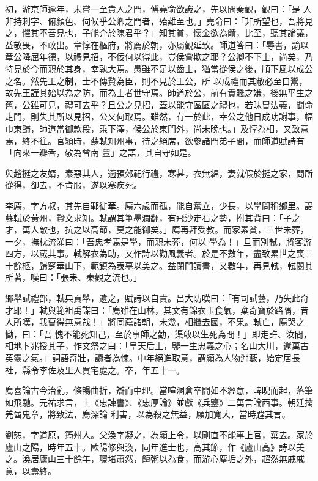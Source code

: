 \begin{pinyinscope}
 初，游京師逾年，未嘗一至貴人之門，傅堯俞欲識之，先以問秦觀，觀曰：「是
 人非持刺字、俯顏色、伺候乎公卿之門者，殆難至也。」堯俞曰：「非所望也，吾將見之，懼其不吾見也，子能介於陳君乎？」知其貧，懷金欲為饋，比至，聽其論議，益敬畏，不敢出。章惇在樞府，將薦於朝，亦屬觀延致。師道答曰：「辱書，諭以章公降屈年德，以禮見招，不佞何以得此，豈侯嘗欺之耶？公卿不下士，尚矣，乃特見於今而親於其身，幸孰大焉。愚雖不足以齒士，猶當從侯之後，順下風以成公之名。然先王之制，士不傳贄為臣，則不見於王公，所
 以成禮而其敝必至自鬻，故先王謹其始以為之防，而為士者世守焉。師道於公，前有貴賤之嫌，後無平生之舊，公雖可見，禮可去乎？且公之見招，蓋以能守區區之禮也，若昧冒法義，聞命走門，則失其所以見招，公又何取焉。雖然，有一於此，幸公之他日成功謝事，幅巾東歸，師道當御款段，乘下澤，候公於東門外，尚未晚也。」及惇為相，又致意焉，終不往。官潁時，蘇軾知州事，待之絕席，欲參諸門弟子間，而師道賦詩有「向來一瓣香，敬為曾南
 豐」之語，其自守如是。



 與趙挺之友婿，素惡其人，適預郊祀行禮，寒甚，衣無綿，妻就假於挺之家，問所從得，卻去，不肯服，遂以寒疾死。



 李廌，字方叔，其先自鄆徙華。廌六歲而孤，能自奮立，少長，以學問稱鄉里。謁蘇軾於黃州，贄文求知。軾謂其筆墨瀾翻，有飛沙走石之勢，拊其背曰：「子之才，萬人敵也，抗之以高節，莫之能御矣。」廌再拜受教。而家素貧，三世未葬，一夕，撫枕流涕曰：「吾忠孝焉是學，而親未葬，何以
 學為！」旦而別軾，將客游四方，以蕆其事。軾解衣為助，又作詩以勸風義者。於是不數年，盡致累世之喪三十餘柩，歸窆華山下，範鎮為表墓以美之。益閉門讀書，又數年，再見軾，軾閱其所著，嘆曰：「張耒、秦觀之流也。」



 鄉舉試禮部，軾典貢舉，遺之，賦詩以自責。呂大防嘆曰：「有司試藝，乃失此奇才耶！」軾與範祖禹謀曰：「廌雖在山林，其文有錦衣玉食氣，棄奇寶於路隅，昔人所嘆，我曹得無意哉！」將同薦諸朝，未幾，相繼去國，不果。軾亡，廌哭之慟，曰：「吾
 愧不能死知己，至於事師之勤，渠敢以生死為間！」即走許、汝間，相地卜兆授其子，作文祭之曰：「皇天后土，鑒一生忠義之心；名山大川，還萬古英靈之氣。」詞語奇壯，讀者為悚。中年絕進取意，謂潁為人物淵藪，始定居長社，縣令李佐及里人買宅處之。卒，年五十一。



 廌喜論古今治亂，條暢曲折，辯而中理。當喧溷倉卒間如不經意，睥睨而起，落筆如飛馳。元祐求言，上《忠諫書》、《忠厚論》並獻《兵鑒》二萬言論西事。朝廷擒羌酋鬼章，將致法，廌深論
 利害，以為殺之無益，願加寬大，當時韙其言。



 劉恕，字道原，筠州人。父渙字凝之，為潁上令，以剛直不能事上官，棄去。家於廬山之陽，時年五十。歐陽修與渙，同年進士也，高其節，作《廬山高》詩以美之。渙居廬山三十餘年，環堵蕭然，饘粥以為食，而游心塵垢之外，超然無戚戚意，以壽終。




\end{pinyinscope}
